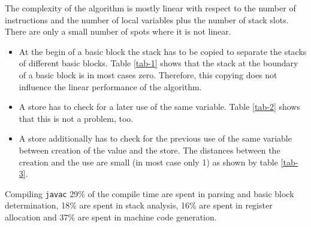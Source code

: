 The complexity of the algorithm is mostly linear with respect to the number
of instructions and the number of local variables plus the number of stack
slots. There are only a small number of spots where it is not linear. 

\begin{itemize}
\item At the begin of a basic block the stack has to be copied to separate
      the stacks of different basic blocks. Table \ref{tab-1} shows that
      the stack at the boundary of a basic block is in most cases zero.
      Therefore, this copying does not influence the linear performance of
      the algorithm.
\item A store has to check for a later use of the same variable. Table
      \ref{tab-2} shows that this is not a problem, too.
\item A store additionally has to check for the previous use of the same
      variable between creation of the value and the store. The distances
      between the creation and the use are small (in most case only 1) as
      shown by table \ref{tab-3}.
\end{itemize}

Compiling {\tt javac} 29\% of the compile time are spent in parsing and
basic block determination, 18\% are spent in stack analysis, 16\% are spent
in register allocation and 37\% are spent in machine code generation.


